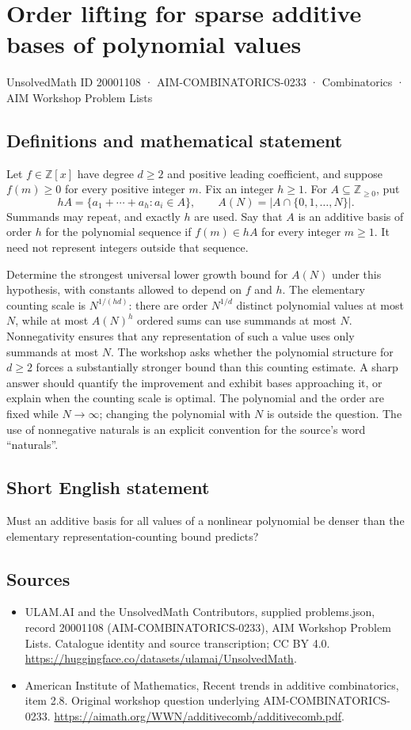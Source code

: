 \documentclass[11pt,a4paper]{article}
\begin{document}
\section*{Order lifting for sparse additive bases of polynomial values}\label{20001108}
{\small UnsolvedMath ID 20001108 · AIM-COMBINATORICS-0233 · Combinatorics · AIM Workshop Problem Lists}
\subsection{Definitions and mathematical statement}
Let $f\in\mathbb Z[x]$ have degree $d\geq2$ and positive leading coefficient, and suppose $f(m)\geq0$ for every positive integer $m$.
Fix an integer $h\geq1$.
For $A\subseteq\mathbb Z_{\geq0}$, put
\[
 hA=\{a_1+\cdots+a_h:a_i\in A\},\qquad
 A(N)=|A\cap\{0,1,\ldots,N\}|.
\]
Summands may repeat, and exactly $h$ are used.
Say that $A$ is an additive basis of order $h$ for the polynomial sequence if $f(m)\in hA$ for every integer $m\geq1$.
It need not represent integers outside that sequence.

Determine the strongest universal lower growth bound for $A(N)$ under this hypothesis, with constants allowed to depend on $f$ and $h$.
The elementary counting scale is $N^{1/(hd)}$: there are order $N^{1/d}$ distinct polynomial values at most $N$, while at most $A(N)^h$ ordered sums can use summands at most $N$.
Nonnegativity ensures that any representation of such a value uses only summands at most $N$.
The workshop asks whether the polynomial structure for $d\geq2$ forces a substantially stronger bound than this counting estimate.
A sharp answer should quantify the improvement and exhibit bases approaching it, or explain when the counting scale is optimal.
The polynomial and the order are fixed while $N\to\infty$; changing the polynomial with $N$ is outside the question.
The use of nonnegative naturals is an explicit convention for the source's word ``naturals''.
\subsection{Short English statement}
Must an additive basis for all values of a nonlinear polynomial be denser than the elementary representation-counting bound predicts?
\subsection{Sources}
\begin{itemize}
\item[S1] ULAM.AI and the UnsolvedMath Contributors, supplied problems.json, record 20001108 (AIM-COMBINATORICS-0233), AIM Workshop Problem Lists. Catalogue identity and source transcription; CC BY 4.0.
\url{https://huggingface.co/datasets/ulamai/UnsolvedMath}.
\item[S2] American Institute of Mathematics, Recent trends in additive combinatorics, item 2.8. Original workshop question underlying AIM-COMBINATORICS-0233.
\url{https://aimath.org/WWN/additivecomb/additivecomb.pdf}.
\end{itemize}
\end{document}
